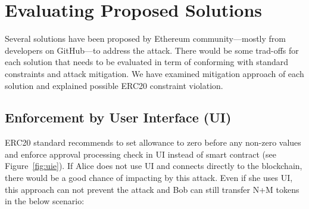 
\section{Evaluating Proposed Solutions}\label{sec:eval}

Several solutions have been proposed by Ethereum community---mostly from developers on GitHub\cite{Ref07}---to address the attack. There would be some trad-offs for each solution that needs to be evaluated in term of conforming with standard constraints and attack mitigation. We have examined mitigation approach of each solution and explained possible ERC20 constraint violation.

\subsection{Enforcement by User Interface (UI)}


ERC20 standard recommends to set allowance to zero before any non-zero values and enforce approval processing check in UI instead of smart contract (see Figure~\ref{fig:uie}). If Alice does not use UI and connects directly to the blockchain, there would be a good chance of impacting by this attack. Even if she uses UI, this approach can not prevent the attack \cite{Ref14} and Bob can still transfer N+M tokens in the below scenario:



